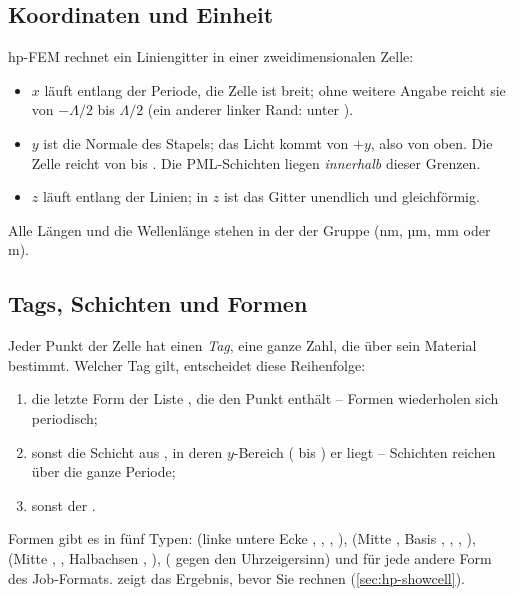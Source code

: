 \subsection{Koordinaten und Einheit}\label{sec:hp-koordinaten}

hp-FEM rechnet ein Liniengitter in einer zweidimensionalen Zelle:

\begin{itemize}
  \item $x$ läuft entlang der Periode, die Zelle ist  breit; ohne weitere Angabe reicht
    sie von $-\Lambda/2$ bis $\Lambda/2$ (ein anderer linker Rand:  unter
    ).
  \item $y$ ist die Normale des Stapels; das Licht kommt von $+y$, also von oben. Die Zelle reicht
    von  bis . Die PML-Schichten liegen \emph{innerhalb} dieser
    Grenzen.
  \item $z$ läuft entlang der Linien; in $z$ ist das Gitter unendlich und gleichförmig.
\end{itemize}

Alle Längen und die Wellenlänge stehen in der  der Gruppe  (nm, µm, mm
oder m).

\subsection{Tags, Schichten und Formen}

Jeder Punkt der Zelle hat einen \emph{Tag}, eine ganze Zahl, die über  sein
Material bestimmt. Welcher Tag gilt, entscheidet diese Reihenfolge:

\begin{enumerate}
  \item die letzte Form der Liste , die den Punkt enthält -- Formen
    wiederholen sich periodisch;
  \item sonst die Schicht aus , in deren $y$-Bereich ( bis
    ) er liegt -- Schichten reichen über die ganze Periode;
  \item sonst der .
\end{enumerate}

Formen gibt es in fünf Typen:  (linke untere Ecke , , ,
),  (Mitte , Basis , , ,
),  (Mitte , , Halbachsen , ),
 ( gegen den Uhrzeigersinn) und  für jede andere
Form des Job-Formats.  zeigt das Ergebnis, bevor Sie rechnen
(\autoref{sec:hp-showcell}).


